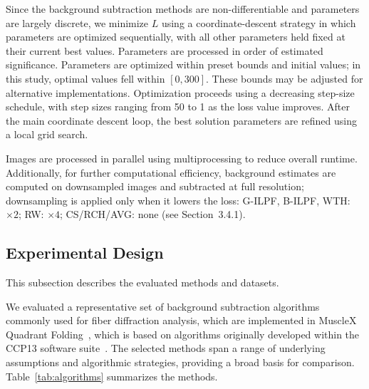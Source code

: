 \documentclass[iucr]{iucrjournals}
\begin{document}
Since the background subtraction methods are non-differentiable and parameters are largely discrete, we minimize $L$ using a coordinate-descent strategy in which parameters are optimized sequentially, with all other parameters held fixed at their current best values. Parameters are processed in order of estimated significance. Parameters are optimized within preset bounds and initial values; in this study, optimal values fell within $[0,300]$. These bounds may be adjusted for alternative implementations. Optimization proceeds using a decreasing step-size schedule, with step sizes ranging from 50 to 1 as the loss value improves. After the main coordinate descent loop, the best solution parameters are refined using a local grid search.

Images are processed in parallel using multiprocessing to reduce overall runtime. Additionally, for further computational efficiency, background estimates are computed on downsampled images and subtracted at full resolution; downsampling is applied only when it lowers the loss: G-ILPF, B-ILPF, WTH: $\times 2$; RW: $ \times 4$; CS/RCH/AVG: none (see Section~3.4.1).



\subsection{Experimental Design}

This subsection describes the evaluated methods and datasets.

We evaluated a representative set of background subtraction algorithms commonly used for fiber diffraction analysis, which are implemented in MuscleX Quadrant Folding~\cite{JiratrakanvongEtAl2024}, which is based on algorithms originally developed within the CCP13 software suite~\cite{HeEtAl2007}. The selected methods span a range of underlying assumptions and algorithmic strategies, providing a broad basis for comparison. Table~\ref{tab:algorithms} summarizes the methods.
\end{document}

